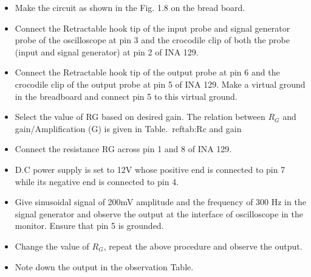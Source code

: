 \documentclass[9pt]{scrreprt}
\begin{document}
\begin{itemize}
\item Make the circuit as shown in the Fig. 1.8 on the bread board.
\item Connect the Retractable hook tip of the input probe and signal generator probe of the oscilloscope at pin 3 and the crocodile clip of both the probe (input and signal generator) at pin 2 of INA 129.
\item Connect the Retractable hook tip of the output probe at pin 6 and the crocodile clip of the output probe at pin 5 of INA 129. Make a virtual ground in the breadboard and connect pin 5 to this virtual ground.
\item Select the value of RG based on desired gain. The relation between $R_G$ and gain/Amplification (G) is given in Table.~ref{tab:Rc and gain}
\item Connect the resistance RG across pin 1 and 8 of INA 129.
\item D.C power supply is set to 12V whose positive end is connected to pin 7 while its negative end is connected to pin 4.
\item Give sinusoidal signal of 200mV amplitude and the frequency of 300 Hz in the signal generator and observe the output at the interface of oscilloscope in the monitor. Ensure that pin 5 is grounded.
\item Change the value of $R_G$, repeat the above procedure and observe the output.
\item Note down the output in the observation Table.
\end{itemize}
\end{document}
